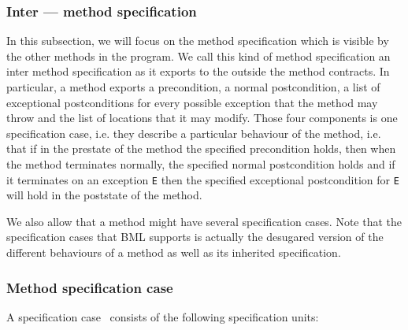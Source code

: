 \subsubsection{Inter --- method specification}
In this subsection, we will focus on the method specification which is visible by the other methods in the program.
We call this kind of method specification an inter method specification as it exports to the outside the method contracts.
In particular, a method exports a precondition, a normal postcondition, a list of exceptional postconditions for every possible exception that the method may throw
 and the list of locations that it may modify. Those four components is one specification case, i.e. they describe a particular behaviour of the method, i.e. that if in the
prestate of the method the specified precondition holds, then when the method terminates normally, the specified normal postcondition holds and if 
it terminates on an exception \texttt{E} then the specified exceptional postcondition for  \texttt{E} will hold in the poststate of the method.
  
We also allow that a method might have several specification cases. 
Note that the specification cases that BML supports is actually the desugared version 
of the different behaviours of a method as well as its inherited specification.

\subsubsection{Method specification case}
A specification case \specCase \  consists of the following specification units:


